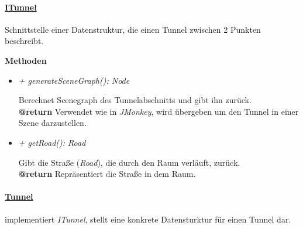     
       
        \paragraph{\underline{ITunnel}} \mbox{}\par
           Schnittstelle einer Datenstruktur, die einen Tunnel zwischen 2 Punkten beschreibt.\par

            \textbf{Methoden}					
            \begin{itemize}
                \item  \textit{+ generateSceneGraph(): Node}
                    \begin{leftbar}[0.9\linewidth]
                        Berechnet Scenegraph des Tunnelabschnitts und gibt ihn zurück.\\
                        \textbf{@return}  Verwendet wie in \textit{JMonkey}, wird übergeben um den Tunnel in einer Szene darzustellen.
                    \end{leftbar}

                \item  \textit{+ getRoad(): Road}
                    \begin{leftbar}[0.9\linewidth]
                        Gibt die Straße (\textit{Road}), die durch den Raum verläuft, zurück.\\
                        \textbf{@return} Repräsentiert die Straße in dem Raum.
                    \end{leftbar}     
            \end{itemize}
        
        
        \pagebreak
        \paragraph{\underline{Tunnel}} \mbox{}\par
            implementiert \textit{ITunnel}, stellt eine konkrete Datensturktur für einen Tunnel dar.\par
            
